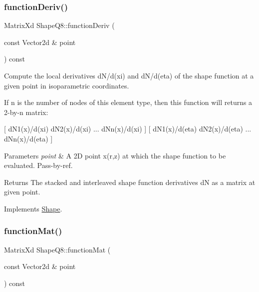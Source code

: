 \subsubsection{\texorpdfstring{function\+Deriv()}{functionDeriv()}}
{\footnotesize\ttfamily Matrix\+Xd Shape\+Q8\+::function\+Deriv (\begin{DoxyParamCaption}\item[{const Vector2d \&}]{point }\end{DoxyParamCaption}) const\hspace{0.3cm}{\ttfamily [virtual]}}



Compute the local derivatives d\+N/d(xi) and d\+N/d(eta) of the shape function at a given point in isoparametric coordinates. 

If n is the number of nodes of this element type, then this function will returns a 2-\/by-\/n matrix\+:

\mbox{[} d\+N1(x)/d(xi) d\+N2(x)/d(xi) ... d\+Nn(x)/d(xi) \mbox{]} \mbox{[} d\+N1(x)/d(eta) d\+N2(x)/d(eta) ... d\+Nn(x)/d(eta) \mbox{]}


\begin{DoxyParams}{Parameters}
{\em point} & A 2D point x(r,z) at which the shape function to be evaluated. Pass-\/by-\/ref. \\
\hline
\end{DoxyParams}
\begin{DoxyReturn}{Returns}
The stacked and interleaved shape function derivatives dN as a matrix at given point. 
\end{DoxyReturn}


Implements \mbox{\hyperlink{class_shape_a29de5d31e0fa74a4d1067f6d14cd94ed}{Shape}}.

\mbox{\label{class_shape_q8_a5e84879bda809350eb6f70a6d01d73f1}} 
\subsubsection{\texorpdfstring{function\+Mat()}{functionMat()}}
{\footnotesize\ttfamily Matrix\+Xd Shape\+Q8\+::function\+Mat (\begin{DoxyParamCaption}\item[{const Vector2d \&}]{point }\end{DoxyParamCaption}) const\hspace{0.3cm}{\ttfamily [virtual]}}



